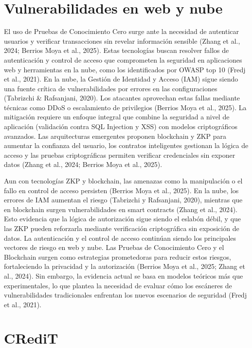 \documentclass[conference]{IEEEtran}
\begin{document}
\section{Vulnerabilidades en web y nube}
El uso de Pruebas de Conocimiento Cero  surge ante la necesidad de autenticar usuarios y verificar transacciones sin revelar información sensible (Zhang et al., 2024; Berrios Moya et al., 2025). Estas tecnologías buscan resolver fallos de autenticación y control de acceso que comprometen la seguridad en aplicaciones web y herramientas en la nube, como los identificados por OWASP top 10 (Fredj et al., 2021). En la nube, la Gestión de Identidad y Acceso (IAM) sigue siendo una fuente crítica de vulnerabilidades por errores en las configuraciones (Tabrizchi & Rafsanjani, 2020). Los atacantes aprovechan estas fallas mediante técnicas como DDoS o escalamiento de privilegios (Berrios Moya et al., 2025). La mitigación requiere un enfoque integral que combine la seguridad a nivel de aplicación (validación contra SQL Injection y XSS) con modelos criptográficos avanzados. Las arquitecturas emergentes proponen blockchain y ZKP para aumentar la confianza del usuario, los contratos inteligentes gestionan la lógica de acceso y las pruebas criptográficas permiten verificar credenciales sin exponer datos (Zhang et al., 2024; Berrios Moya et al., 2025).


Aun con tecnologías ZKP y blockchain, las amenazas como la manipulación o el fallo en control de acceso persisten (Berrios Moya et al., 2025). En la nube, los errores de IAM aumentan el riesgo (Tabrizchi y Rafsanjani, 2020), mientras que en blockchain surgen vulnerabilidades en smart contracts (Zhang et al., 2024). Esto evidencia que la lógica de autorización sigue siendo el eslabón débil, y que las ZKP pueden reforzarla mediante verificación criptográfica sin exposición de datos. La autenticación y el control de acceso continúan siendo los principales vectores de riesgo en web y nube. Las Pruebas de Conocimiento Cero y el Blockchain surgen como estrategias prometedoras para reducir estos riesgos, fortaleciendo la privacidad y la autorización (Berrios Moya et al., 2025; Zhang et al., 2024). Sin embargo, la evidencia actual se basa en modelos teóricos más que experimentales, lo que plantea la necesidad de evaluar cómo los escáneres de vulnerabilidades tradicionales enfrentan los nuevos escenarios de seguridad (Fredj et al., 2021).

\section*{CRediT}
\end{document}
